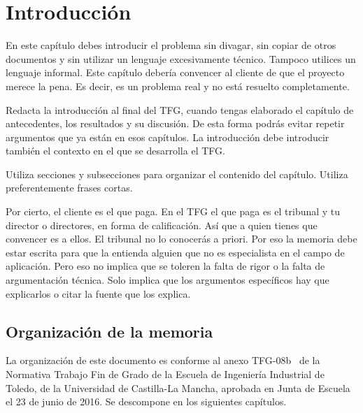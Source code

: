 \chapter{Introducción} 
\label{ch:introduccion}

En este capítulo debes introducir el problema sin divagar, sin copiar de otros documentos y sin utilizar un lenguaje excesivamente técnico.  Tampoco utilices un lenguaje informal.  Este capítulo debería convencer al cliente de que el proyecto merece la pena.  Es decir, es un problema real y no está resuelto completamente.

Redacta la introducción al final del TFG, cuando tengas elaborado el capítulo de antecedentes, los resultados y su discusión.  De esta forma podrás evitar repetir argumentos que ya están en esos capítulos.  La introducción debe introducir también el contexto en el que se desarrolla el TFG.

Utiliza secciones y subsecciones para organizar el contenido del capítulo.  Utiliza preferentemente frases cortas.

Por cierto, el cliente es el que paga.  En el TFG el que paga es el tribunal y tu director o directores, en forma de calificación.  Así que a quien tienes que convencer es a ellos.  El tribunal no lo conocerás a priori.  Por eso la memoria debe estar escrita para que la entienda alguien que no es especialista en el campo de aplicación.  Pero eso no implica que se toleren la falta de rigor o la falta de argumentación técnica.  Solo implica que los argumentos específicos hay que explicarlos o citar la fuente que los explica.


\section{Organización de la memoria} 
\label{sec:organizacion-memoria}

La organización de este documento es conforme al anexo TFG-08b~\cite{tfg08b} de la Normativa Trabajo Fin de Grado de la Escuela de Ingeniería Industrial de Toledo, de la Universidad de Castilla-La Mancha, aprobada en Junta de Escuela el 23 de junio de 2016. Se descompone en los siguientes capítulos.

